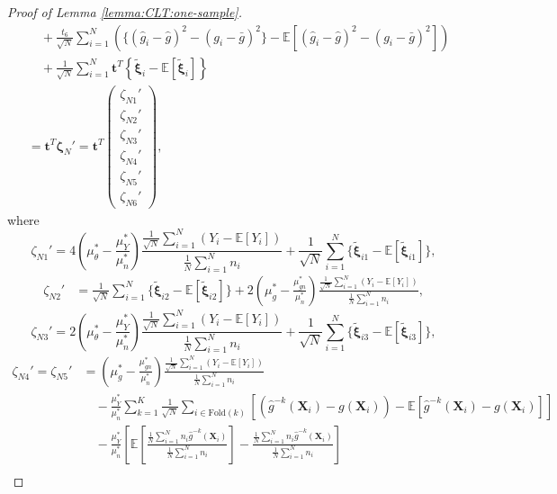 \documentclass[12pt,letterpaper]{article}
\begin{document}
\begin{proof}[Proof of Lemma \ref{lemma:CLT:one-sample}]
\begin{equation}
\begin{array}{rl}
&\displaystyle\quad+\frac{t_6}{\sqrt{N}}\sum_{i=1}^N\left(\{(\hat{g}_i-\hat{g})^2-(g_i-\bar{g})^2\}-\mathbb{E}[(\hat{g}_i-\hat{g})^2-(g_i-\bar{g})^2]\right)\\
&\displaystyle\quad+\frac{1}{\sqrt{N}}\sum_{i=1}^N\mathbf{t}^T\left\{\tilde{\boldsymbol{\xi}}_i-\mathbb{E}[\tilde{\boldsymbol{\xi}}_i]\right\}\\
&=\displaystyle\mathbf{t}^T\boldsymbol{\zeta}_N'=\mathbf{t}^T\begin{pmatrix}
    \zeta_{N1}'\\
    \zeta_{N2}'\\
    \zeta_{N3}'\\
    \zeta_{N4}'\\
    \zeta_{N5}'\\
    \zeta_{N6}'
\end{pmatrix},
\end{array}
\end{equation}
where 
$$\zeta_{N1}'=4\left(\mu_{\theta}^*-\frac{\mu_Y^*}{\mu_n^*}\right)\frac{\displaystyle\frac{1}{\sqrt{N}}\sum_{i=1}^N(Y_i-\mathbb{E}[Y_i])}{\displaystyle\frac{1}{N}\sum_{i=1}^Nn_i}+\frac{1}{\sqrt{N}}\sum_{i=1}^N\{\tilde{\boldsymbol{\xi}}_{i1}-\mathbb{E}[\tilde{\boldsymbol{\xi}}_{i1}]\},$$
$$\begin{array}{rl}
\zeta_{N2}'\!\!\!\!&\displaystyle=\frac{1}{\sqrt{N}}\sum_{i=1}^N\{\tilde{\boldsymbol{\xi}}_{i2}-\mathbb{E}[\tilde{\boldsymbol{\xi}}_{i2}]\}+2\left(\mu_g^*-\frac{\mu_{gn}^*}{\mu_n^*}\right)\frac{\displaystyle\frac{1}{\sqrt{N}}\sum_{i=1}^N(Y_i-\mathbb{E}[Y_i])}{\displaystyle\frac{1}{N}\sum_{i=1}^Nn_i},
\end{array}$$
$$\zeta_{N3}'=2\left(\mu_{\theta}^*-\frac{\mu_Y^*}{\mu_n^*}\right)\frac{\displaystyle\frac{1}{\sqrt{N}}\sum_{i=1}^N(Y_i-\mathbb{E}[Y_i])}{\displaystyle\frac{1}{N}\sum_{i=1}^Nn_i}+\frac{1}{\sqrt{N}}\sum_{i=1}^N\{\tilde{\boldsymbol{\xi}}_{i3}-\mathbb{E}[\tilde{\boldsymbol{\xi}}_{i3}]\},$$
$$\begin{array}{rl}
\zeta_{N4}'=\zeta_{N5}'\!\!\!\!&\displaystyle=\left(\mu_g^*-\frac{\mu_{gn}^*}{\mu_n^*}\right)\frac{\displaystyle\frac{1}{\sqrt{N}}\sum_{i=1}^N(Y_i-\mathbb{E}[Y_i])}{\displaystyle\frac{1}{N}\sum_{i=1}^Nn_i}\\
&\displaystyle\quad-\frac{\mu_Y^*}{\mu_n^*}\sum_{k=1}^K\frac{1}{\sqrt{N}}\!\!\sum_{i\in\textrm{Fold}(k)}\left[\left(\hat{g}^{-k}(\mathbf{X}_i)-g(\mathbf{X}_i)\right)-\mathbb{E}[\hat{g}^{-k}(\mathbf{X}_i)-g(\mathbf{X}_i)]\right]\\
&\displaystyle\quad-\frac{\mu_Y^*}{\mu_n^*}\left[\mathbb{E}\left[\frac{\frac{1}{N}\sum_{i=1}^Nn_i\hat{g}^{-k}(\mathbf{X}_i)}{\frac{1}{N}\sum_{i=1}^Nn_i}\right]-\frac{\frac{1}{N}\sum_{i=1}^Nn_i\hat{g}^{-k}(\mathbf{X}_i)}{\frac{1}{N}\sum_{i=1}^Nn_i}\right]\\

\end{array}$$
\end{proof}
\end{document}
